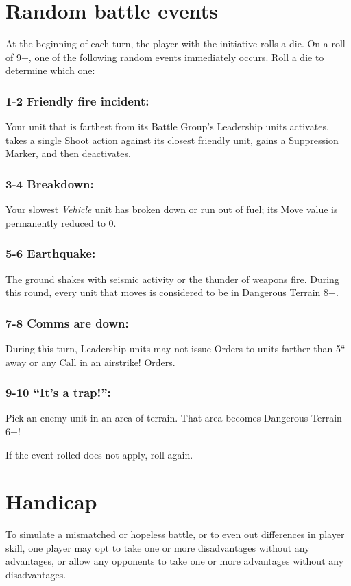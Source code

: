 \begin{multicols}{2}
\section*{Random battle events}
At the beginning of each turn, the player with the initiative rolls a die. On a roll of 9+, one of the following random events immediately occurs. Roll a die to determine which one:

\subsubsection*{1-2 Friendly fire incident:} Your unit that is farthest from its Battle Group's Leadership units activates, takes a single Shoot action against its closest friendly unit, gains a Suppression Marker, and then deactivates.

\subsubsection*{3-4 Breakdown:} Your slowest \textit{Vehicle} unit has broken down or run out of fuel; its Move value is permanently reduced to 0.

\subsubsection*{5-6 Earthquake:} The ground shakes with seismic activity or the thunder of weapons fire. During this round, every unit that moves is considered to be in Dangerous Terrain 8+.

\subsubsection*{7-8 Comms are down:} During this turn, Leadership units may not issue Orders to units farther than 5`` away or any Call in an airstrike! Orders.

\subsubsection*{9-10 ``It's a trap!'':} Pick an enemy unit in an area of terrain. That area becomes Dangerous Terrain 6+!

If the event rolled does not apply, roll again.




\section*{Handicap}
To simulate a mismatched or hopeless battle, or to even out differences in player skill, one player may opt to take one or more disadvantages without any advantages,  or allow any opponents to take one or more advantages without any disadvantages.

\end{multicols}

